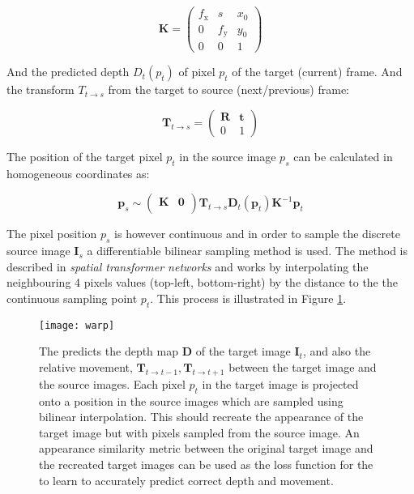 \begin{equation}
\textbf{K} = 
\begin{pmatrix}
f_\mathrm{x} & s & x_0 \\
0 & f_\mathrm{y} & y_0 \\
0 & 0   & 1
\end{pmatrix}
\end{equation}

And the predicted depth $ D_t(p_t) $ of pixel $ p_t $ of the target (current) frame. And the transform $ T_{t \rightarrow s} $ from the target to source (next/previous) frame:

\begin{equation}
\textbf{T}_{t \rightarrow s} =
\begin{pmatrix}
\textbf{R} & \textbf{t} \\
0 & 1
\end{pmatrix}
\end{equation}

The position of the target pixel $ p_t $ in the source image $ p_s $ can be calculated in homogeneous coordinates as:

\begin{equation}
\textbf{p}_s \sim 
\begin{pmatrix}
\textbf{K}  & \textbf{0} \\
\end{pmatrix}
\textbf{T}_{t \rightarrow s} \textbf{D}_t(\textbf{p}_t) \textbf{K}^{-1} \textbf{p}_t 
\end{equation}

The pixel position $ p_s $ is however continuous and in order to sample the discrete source image $ \textbf{I}_s $ a differentiable bilinear sampling method is used. The method is described in \textit{spatial transformer networks}\cite{spatialtransformernetworks} and works by interpolating the neighbouring 4 pixels values (top-left, bottom-right) by the distance to the the continuous sampling point $ p_t $. This process is illustrated in Figure \ref{fig:warp}.


\begin{figure}[H]
	\centering
	\texttt{[image: warp]}
	\caption{The \abbrCNN predicts the depth map $\textbf{D}$ of the target image $\textbf{I}_t$, and also the relative movement, $\textbf{T}_{t\rightarrow t-1}, \textbf{T}_{t\rightarrow t+1}$ between the target image and the source images. Each pixel $p_t$ in the target image is projected onto a position in the source images which are sampled using bilinear interpolation. This should recreate the appearance of the target image but with pixels sampled from the source image. An appearance similarity metric between the original target image and the recreated target images can be used as the loss function for the \abbrCNN to learn to accurately predict correct depth and movement.}
	\label{fig:warp}
\end{figure}


